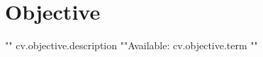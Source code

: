 \section{Objective}
\vspace{-4pt}
{\setlength{\parskip}{0pt}
 {{"{"}}{{ cv.objective.description }} \hfill{{"{"}}Available: {{ cv.objective.term }}{{"}"}}\break}
}